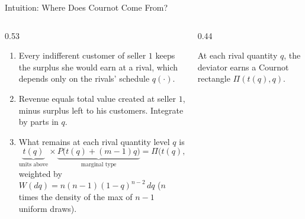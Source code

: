 \documentclass[11pt,aspectratio=169]{beamer}
\def\meditem{\smallskip\item}
\begin{document}
\begin{frame}{Intuition: Where Does Cournot Come From?}
\begin{columns}[T]
\begin{column}{0.53\textwidth}
\begin{enumerate}
\item Every indifferent customer of seller $1$ keeps the surplus she would earn at a rival, which depends only on the rivals' schedule $q(\cdot)$.
\meditem Revenue equals total value created at seller $1$, minus surplus left to his customers. Integrate by parts in $q$.
\meditem<2-> What remains at each rival quantity level $q$ is
\[
\underbrace{t(q)}_{\text{units above}}\times\underbrace{P\bigl(t(q)+(m-1)q\bigr)}_{\text{marginal type}} = \Pi\bigl(t(q),q\bigr),
\]
weighted by $W(dq)=n(n-1)(1-q)^{n-2}\,dq$ ($n$ times the density of the max of $n-1$ uniform draws).
\end{enumerate}
\end{column}
\begin{column}{0.44\textwidth}
\centering
{}

{\scriptsize At each rival quantity $q$, the deviator earns a Cournot rectangle $\Pi(t(q),q)$.}
\end{column}
\end{columns}
\end{frame}
\end{document}
